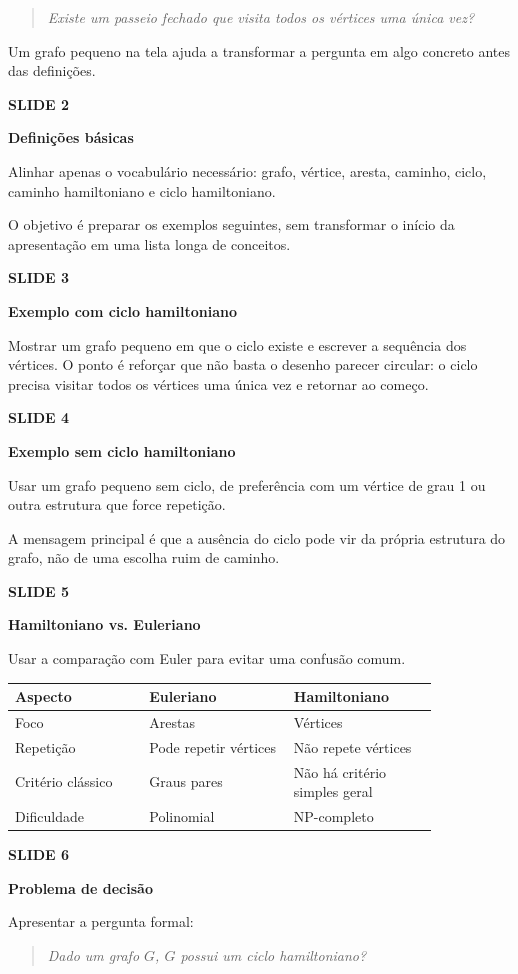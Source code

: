 \documentclass[11pt,a4paper]{article}
\newcommand{\slide}[2]{%
  \vspace{0.9em}
  {\small\bfseries\color{muted}SLIDE #1}\par
  {\large\bfseries #2}\par
  \vspace{-0.3em}
}
\newcommand{\question}[1]{%
  \begin{quote}
    \itshape #1
  \end{quote}
}
\begin{document}
\question{Existe um passeio fechado que visita todos os vértices uma única vez?}

Um grafo pequeno na tela ajuda a transformar a pergunta em algo concreto antes das definições.

\slide{2}{Definições básicas}

Alinhar apenas o vocabulário necessário: grafo, vértice, aresta, caminho, ciclo, caminho hamiltoniano e ciclo hamiltoniano.

O objetivo é preparar os exemplos seguintes, sem transformar o início da apresentação em uma lista longa de conceitos.

\slide{3}{Exemplo com ciclo hamiltoniano}

Mostrar um grafo pequeno em que o ciclo existe e escrever a sequência dos vértices. O ponto é reforçar que não basta o desenho parecer circular: o ciclo precisa visitar todos os vértices uma única vez e retornar ao começo.

\slide{4}{Exemplo sem ciclo hamiltoniano}

Usar um grafo pequeno sem ciclo, de preferência com um vértice de grau 1 ou outra estrutura que force repetição.

A mensagem principal é que a ausência do ciclo pode vir da própria estrutura do grafo, não de uma escolha ruim de caminho.

\slide{5}{Hamiltoniano vs. Euleriano}

Usar a comparação com Euler para evitar uma confusão comum.

\begin{center}
\begin{tabular}{@{}p{0.26\linewidth}p{0.29\linewidth}p{0.29\linewidth}@{}}
\toprule
\textbf{Aspecto} & \textbf{Euleriano} & \textbf{Hamiltoniano} \\
\midrule
Foco & Arestas & Vértices \\
Repetição & Pode repetir vértices & Não repete vértices \\
Critério clássico & Graus pares & Não há critério simples geral \\
Dificuldade & Polinomial & NP-completo \\
\bottomrule
\end{tabular}
\end{center}

\slide{6}{Problema de decisão}

Apresentar a pergunta formal:

\question{Dado um grafo $G$, $G$ possui um ciclo hamiltoniano?}
\end{document}
